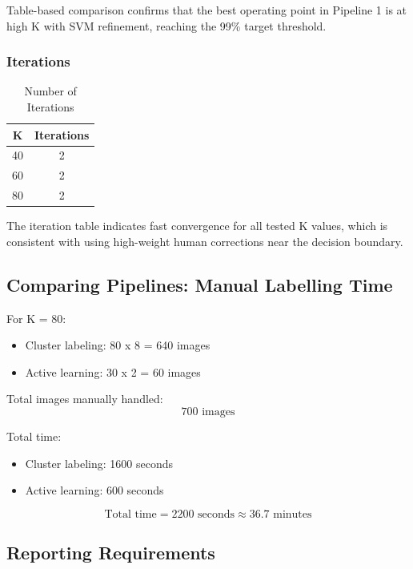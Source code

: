 \documentclass[12pt,a4paper]{article}
\begin{document}
Table-based comparison confirms that the best operating point in Pipeline 1 is at high K with SVM refinement, reaching the 99\% target threshold.

\subsubsection{Iterations}

\begin{table}[H]
\centering
\begin{tabular}{cc}
\toprule
K & Iterations \\
\midrule
40 & 2 \\
60 & 2 \\
80 & 2 \\
\bottomrule
\end{tabular}
\caption{Number of Iterations}
\end{table}

The iteration table indicates fast convergence for all tested K values, which is consistent with using high-weight human corrections near the decision boundary.

\subsection{Comparing Pipelines: Manual Labelling Time}

For K = 80:

\begin{itemize}
    \item Cluster labeling: 80 x 8 = 640 images
    \item Active learning: 30 x 2 = 60 images
\end{itemize}

Total images manually handled:
\[
700 \text{ images}
\]

Total time:
\begin{itemize}
    \item Cluster labeling: 1600 seconds
    \item Active learning: 600 seconds
\end{itemize}

\[
\text{Total time} = 2200 \text{ seconds} \approx 36.7 \text{ minutes}
\]

\subsection{Reporting Requirements}
\end{document}
